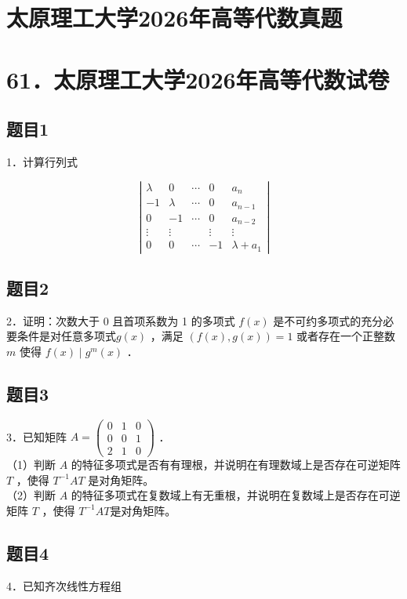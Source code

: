 \documentclass{article}
\begin{document}
\section*{太原理工大学2026年高等代数真题}
\section*{61．太原理工大学2026年高等代数试卷}

\subsection{题目1}
1．计算行列式

\[
\left|\begin{array}{ccccc}
\lambda & 0 & \cdots & 0 & a_{n} \\
-1 & \lambda & \cdots & 0 & a_{n-1} \\
0 & -1 & \cdots & 0 & a_{n-2} \\
\vdots & \vdots & & \vdots & \vdots \\
0 & 0 & \cdots & -1 & \lambda+a_{1}
\end{array}\right|
\]

\subsection{题目2}
2．证明：次数大于 0 且首项系数为 1 的多项式 \(f(x)\) 是不可约多项式的充分必要条件是对任意多项式\(g(x)\) ，满足 \((f(x), g(x))=1\) 或者存在一个正整数 \(m\) 使得 \(f(x) \mid g^{m}(x)\) ．

\subsection{题目3}
3．已知矩阵 \(A=\left(\begin{array}{lll}0 & 1 & 0 \\ 0 & 0 & 1 \\ 2 & 1 & 0\end{array}\right)\) ．\\
（1）判断 \(A\) 的特征多项式是否有有理根，并说明在有理数域上是否存在可逆矩阵 \(T\) ，使得 \(T^{-1} A T\) 是对角矩阵。\\
（2）判断 \(A\) 的特征多项式在复数域上有无重根，并说明在复数域上是否存在可逆矩阵 \(T\) ，使得 \(T^{-1} A T\)是对角矩阵。

\subsection{题目4}
4．已知齐次线性方程组
\end{document}
